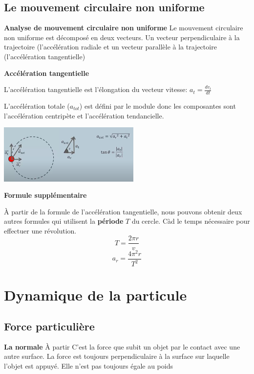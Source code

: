 \documentclass{article}
\begin{document}
\subsection{Le mouvement circulaire non uniforme}
\textbf{Analyse de mouvement circulaire non uniforme}
\newline
Le mouvement circulaire non uniforme est décomposé en deux vecteurs. Un vecteur perpendiculaire à la trajectoire (l'accélération radiale et un vecteur parallèle à la trajectoire (l'accélération tangentielle)
\newline

\noindent
\textbf{Accélération tangentielle}
\newline

L'accélération tangentielle est l'élongation du vecteur vitesse: $a_t = \frac{dv_t}{dt}$
\newline

L'accélération totale ($a_{tot}$) est défini par le module donc les composantes sont l'accélération centripète et l'accélération tendancielle.

 \includegraphics[width=7cm]{Image/atot.png}
\newline

\noindent
\textbf{Formule supplémentaire}
\newline

À partir de la formule de l'accélération tangentielle, nous pouvons obtenir deux autres formules qui utilisent la \textbf{période} $T$ du cercle. Càd le temps nécessaire pour effectuer une révolution.
\[T = \frac{2\pi r}{v}\]
\[a_r = \frac{4\pi^2r}{T^2}\]
\section{Dynamique de la particule}
\subsection{Force particulière}
\noindent
\textbf{La normale}
\newline
À partir
\noindent
C'est la force que subit un objet par le contact avec une autre surface. La force est toujours perpendiculaire à la surface sur laquelle l'objet est appuyé. Elle n'est pas toujours égale au poids
\end{document}
